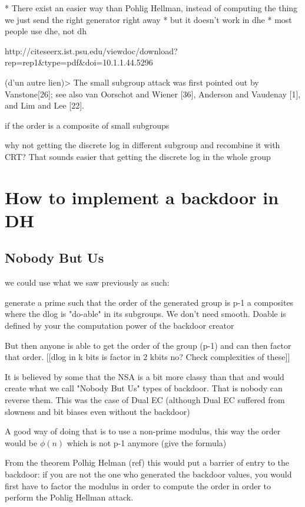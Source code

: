 \documentclass[a4paper,11pt]{article}
\begin{document}
* There exist an easier way than Pohlig Hellman, instead of computing the thing we just send the right generator right away
* but it doesn't work in dhe
* most people use dhe, not dh

http://citeseerx.ist.psu.edu/viewdoc/download?rep=rep1&type=pdf&doi=10.1.1.44.5296

(d'un autre lien)> The small subgroup attack was first pointed out by Vanstone[26]; see also van Oorschot and Wiener [36], Anderson and Vaudenay [1], and Lim and Lee [22].

if the order is a composite of small subgroups

why not getting the discrete log in different subgroup and recombine it with CRT? That sounds easier that getting the discrete log in the whole group


\section{How to implement a backdoor in DH}

\subsection{Nobody But Us}

we could use what we saw previously as such:

generate a prime such that the order of the generated group is p-1 a composites where the dlog is "do-able" in its subgroups. We don't need smooth. Doable is defined by your the computation power of the backdoor creator

But then anyone is able to get the order of the group (p-1) and can then factor that order. [[dlog in k bits is factor in 2 kbits no? Check complexities of these]]

It is believed by some that the NSA is a bit more classy than that and would create what we call "Nobody But Us" types of backdoor. That is nobody can reverse them. This was the case of Dual EC (although Dual EC suffered from slowness and bit biases even without the backdoor)

A good way of doing that is to use a non-prime modulus, this way the order would be $\phi(n)$ which is not p-1 anymore (give the formula)

From the theorem Polhig Helman (ref) this would put a barrier of entry to the backdoor: if you are not the one who generated the backdoor values, you would first have to factor the modulus in order to compute the order in order to perform the Pohlig Hellman attack.
\end{document}
